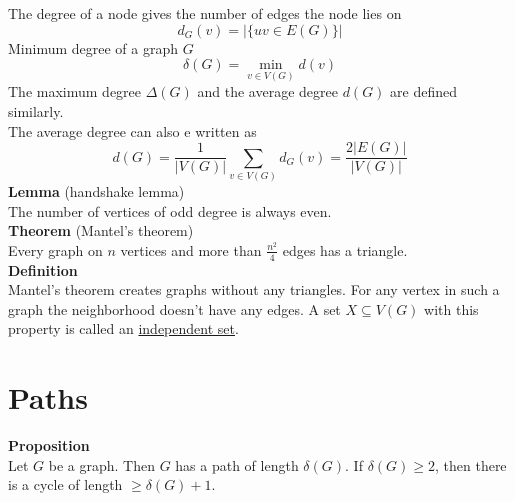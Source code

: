 \documentclass[a4paper, 12pt]{article}
\begin{document}
	The degree of a node gives the number of edges the node lies on \[d_G(v) = \left|\{uv \in E(G)\}\right|\]
	Minimum degree of a graph $G$ \[\delta(G) = \min_{v \in V(G)} d(v)\]
	The maximum degree $\Delta(G)$ and the average degree $d(G)$ are defined similarly.\\
	The average degree can also e written as \[d(G) = \frac{1}{\left|V(G)\right|} \sum_{v \in V(G)} d_G(v) = \frac{2\left|E(G)\right|}{\left|V(G)\right|}\]
	\textbf{Lemma} (handshake lemma)\\
	The number of vertices of odd degree is always even.\\
	\textbf{Theorem} (Mantel's theorem)\\
	Every graph on $n$ vertices and more than $\frac{n^2}{4}$ edges has a triangle.\\
	\textbf{Definition}\\
	Mantel's theorem creates graphs without any triangles. For any vertex in such a graph the neighborhood doesn't have any edges. A set $X \subseteq V(G)$ with this property is called an \underline{independent set}. \\
	\section{Paths}
	\textbf{Proposition}\\
	Let $G$ be a graph. Then $G$ has a path of length $\delta(G)$. If $\delta(G) \geq 2$, then there is a cycle of length $\geq \delta(G)+1$.\\
	
\end{document}

